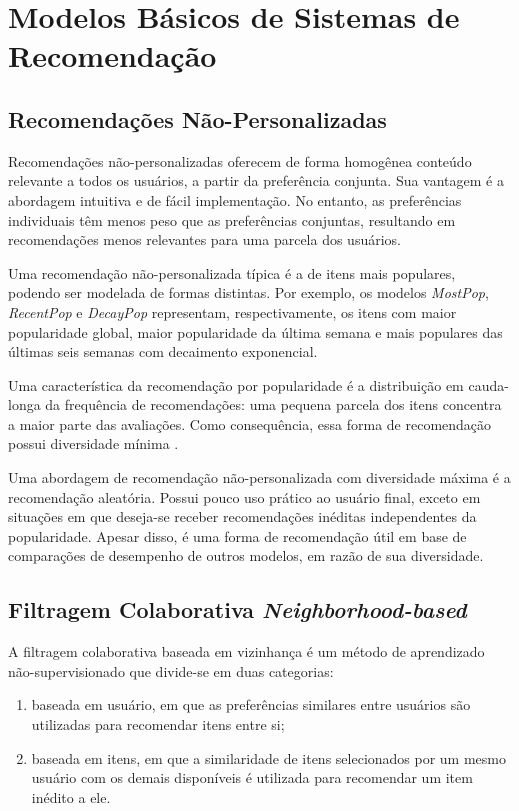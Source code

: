 \section{Modelos Básicos de Sistemas de Recomendação}
\subsection{Recomendações Não-Personalizadas}
Recomendações não-personalizadas oferecem de forma homogênea conteúdo relevante
a todos os usuários, a partir da preferência conjunta. Sua vantagem é a
abordagem intuitiva e de fácil implementação. No entanto, as preferências
individuais têm menos peso que as preferências conjuntas, resultando em
recomendações menos relevantes para uma parcela dos usuários.

Uma recomendação não-personalizada típica é a de itens mais populares, podendo
ser modelada de formas distintas. Por exemplo, os modelos \textit{MostPop},
\textit{RecentPop} e \textit{DecayPop} representam, respectivamente, os itens
com maior popularidade global, maior popularidade da última semana e mais populares das
últimas seis semanas com decaimento exponencial.

Uma característica da recomendação por popularidade é a distribuição em
cauda-longa da frequência de recomendações: uma pequena parcela dos itens
concentra a maior parte das avaliações. Como consequência, essa forma de
recomendação possui diversidade mínima \cite{aggarwal2016recommender}.

Uma abordagem de recomendação não-personalizada com diversidade máxima é a
recomendação aleatória. Possui pouco uso prático ao usuário final, exceto em
situações em que deseja-se receber recomendações inéditas independentes da
popularidade. Apesar disso, é uma forma de recomendação útil em base de
comparações de desempenho de outros modelos, em razão de sua diversidade.

\subsection{Filtragem Colaborativa \textit{Neighborhood-based}} A filtragem
colaborativa baseada em vizinhança é um método de aprendizado não-supervisionado
que divide-se em duas categorias:
\begin{enumerate}
    \item baseada em usuário, em
que as preferências similares entre usuários são utilizadas para recomendar
itens entre si;
    \item baseada em itens, em que a similaridade de itens selecionados
por um mesmo usuário com os demais disponíveis é utilizada para recomendar um
item inédito a ele.
\end{enumerate}

